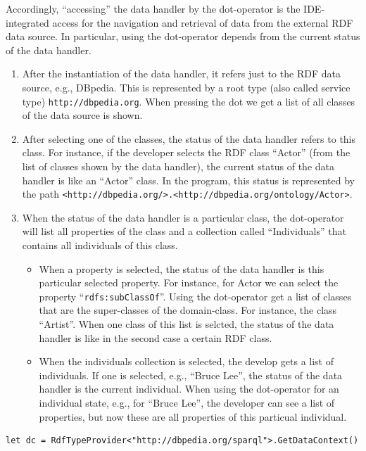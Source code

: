 \documentclass{llncs} %
\begin{document}
Accordingly, ``accessing'' the data handler by the dot-operator is the IDE-integrated
access for the navigation and retrieval of data from the external RDF data source.
In particular, using the dot-operator depends from the current status of
the data handler. 

\begin{enumerate}
	\item After the instantiation of the data handler, it refers just
	       to the RDF data source, e.g., DBpedia. This is represented
	   by a root type (also called service type) \texttt{http://dbpedia.org}.
		  When pressing the dot we get a list of all  classes of the data source is shown.
	\item After selecting one of the classes, the status of the data handler refers to this class.
	    For instance, if the developer selects the RDF class ``Actor'' (from the list of classes shown by the data handler),
			the current status of the data handler is like an ``Actor'' class. In the program,
			this status is represented by the path \texttt{<http://dbpedia.org/>.<http://dbpedia.org/ontology/Actor>}.
  \item When the status of the data handler is a particular class,
		the dot-operator will list all properties of the class and a collection
		called ``Individuals'' that contains all individuals of this class.
		 \begin{itemize}
			 \item When a property is selected, the status of the data handler is this
			   particular selected property. For instance, for Actor we can select the
				  property ``\texttt{rdfs:subClassOf}''. Using the dot-operator get a list of classes
					 that are the super-classes of the domain-class. For instance, the class ``Artist''.
					 When one class of this list is selcted, the status of the data handler is
					 like in the second case a certain RDF class.
				\item When the individuals collection is selected, the develop gets
					a list of individuals. If one is selected, e.g., ``Bruce Lee'', the
					status of the data handler is the current individual.
					When using the dot-operator for an individual state,
					 e.g., for ``Bruce Lee'', the developer can see a list of properties,
					but now these are all properties of this particual individual.
		 \end{itemize}
\end{enumerate}

\begin{lstlisting}[style=code, caption={Initialize data handler}, label={lst:useTP1}]
let dc = RdfTypeProvider<"http://dbpedia.org/sparql">.GetDataContext()
\end{lstlisting}
\end{document}
